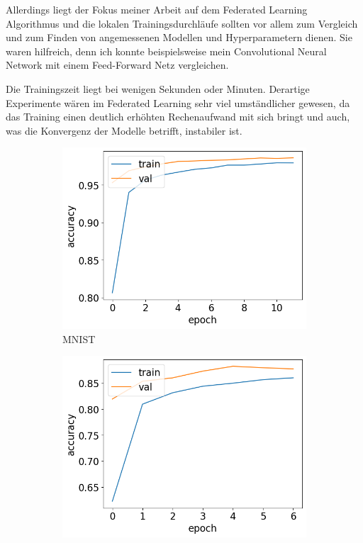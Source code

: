 Allerdings liegt der Fokus meiner Arbeit auf dem Federated Learning Algorithmus und die lokalen Trainingsdurchläufe sollten vor allem zum Vergleich und zum Finden von angemessenen Modellen und Hyperparametern dienen. Sie waren hilfreich, denn ich konnte beispielsweise mein Convolutional Neural Network mit einem Feed-Forward Netz vergleichen. 

Die Trainingszeit liegt bei wenigen Sekunden oder Minuten. Derartige Experimente wären im Federated Learning sehr viel umständlicher gewesen, da das Training einen deutlich erhöhten Rechenaufwand mit sich bringt und auch, was die Konvergenz der Modelle betrifft, instabiler ist.

\begin{figure}
	\centering
	\begin{subfigure}{0.32\textwidth}
		\centering
		\includegraphics[width=\textwidth]{Bilder/mnist-results-local.png}
		\caption{MNIST}
	\end{subfigure}
	\begin{subfigure}{0.32\textwidth}
		\centering
		\includegraphics[width=\textwidth]{Bilder/svhn-results-local.png}

\end{subfigure}
\end{figure}
